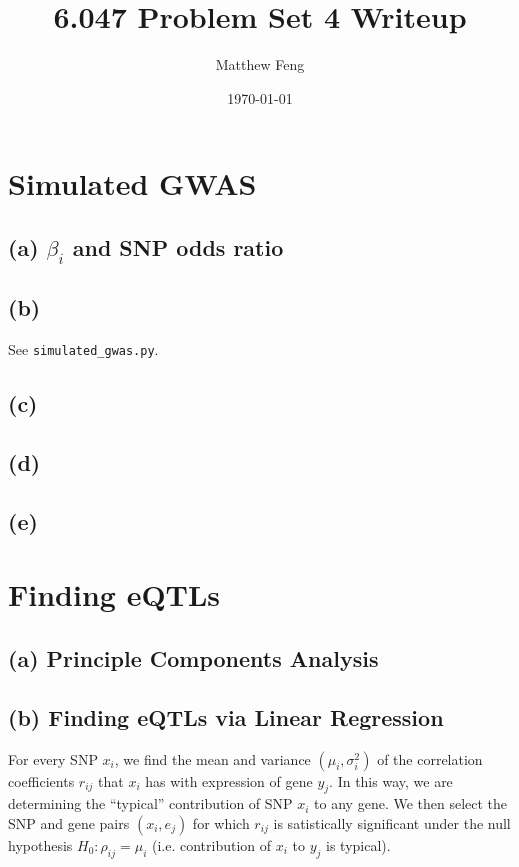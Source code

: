\documentclass{article}[11pt]
\title{6.047 Problem Set 4 Writeup}
\author{Matthew Feng}
\date{\today}
\begin{document}
\maketitle

\section{Simulated GWAS}

\subsection*{(a) $\beta_i$ and SNP odds ratio}
\subsection*{(b)}
See {\tt simulated\_gwas.py}.

\subsection*{(c)}
\subsection*{(d)}
\subsection*{(e)}

\section{Finding eQTLs}

\subsection*{(a) Principle Components Analysis}

\subsection*{(b) Finding eQTLs via Linear Regression}
For every SNP $x_i$, we find the mean and variance
$(\mu_{i}, \sigma_{i}^2)$ of the correlation coefficients $r_{ij}$ that 
$x_i$ has with expression of gene $y_j$. In this way, we are determining
the ``typical'' contribution of SNP $x_i$ to any gene.
We then select the SNP and gene pairs $(x_i, e_j)$ for which
$r_{ij}$ is satistically significant
under the null hypothesis $H_0: \rho_{ij} = \mu_{i}$ (i.e. contribution
of $x_i$ to $y_j$ is typical).
\end{document}
